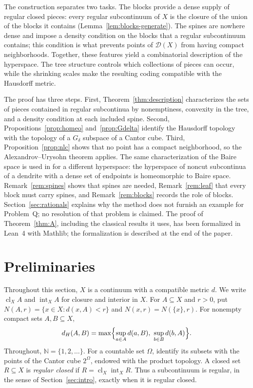 \documentclass[11pt]{amsart}
\theoremstyle{definition}
\theoremstyle{remark}
\newcommand{\clX}{\operatorname{cl}_X}
\newcommand{\intX}{\operatorname{int}_X}
\newcommand{\D}{\mathcal{D}}
\newcommand{\N}{\mathbb{N}}
\newcommand{\dH}{d_H}
\begin{document}
The construction separates two tasks. The blocks provide a dense supply of regular closed pieces: every regular subcontinuum of $X$ is the closure of the union of the blocks it contains (Lemma~\ref{lem:blocks-generate}). The spines are nowhere dense and impose a density condition on the blocks that a regular subcontinuum contains; this condition is what prevents points of $\D(X)$ from having compact neighborhoods. Together, these features yield a combinatorial description of the hyperspace. The tree structure controls which collections of pieces can occur, while the shrinking scales make the resulting coding compatible with the Hausdorff metric.

The proof has three steps. First, Theorem~\ref{thm:description} characterizes the sets of pieces contained in regular subcontinua by nonemptiness, convexity in the tree, and a density condition at each included spine. Second, Propositions~\ref{prop:homeo} and~\ref{prop:Gdelta} identify the Hausdorff topology with the topology of a $G_\delta$ subspace of a Cantor cube. Third, Proposition~\ref{prop:nlc} shows that no point has a compact neighborhood, so the Alexandrov--Urysohn theorem applies. The same characterization of the Baire space is used in \cite[Theorem~5.7]{HMMV} for a different hyperspace: the hyperspace of noncut subcontinua of a dendrite with a dense set of endpoints is homeomorphic to Baire space. Remark~\ref{rem:spines} shows that spines are needed, Remark~\ref{rem:leaf} that every block must carry spines, and Remark~\ref{rem:blocks} records the role of blocks. Section~\ref{sec:rationals} explains why the method does not furnish an example for Problem~Q; no resolution of that problem is claimed. The proof of Theorem~\ref{thm:A}, including the classical results it uses, has been formalized in Lean~4 with Mathlib; the formalization is described at the end of the paper.

\section{Preliminaries}\label{sec:prelim}

Throughout this section, $X$ is a continuum with a compatible metric $d$. We write $\clX A$ and $\intX A$ for closure and interior in $X$. For $A\subseteq X$ and $r>0$, put $N(A,r)=\{x\in X: d(x,A)<r\}$ and $N(x,r)=N(\{x\},r)$. For nonempty compact sets $A,B\subseteq X$,
\[
\dH(A,B)=\max\Bigl\{\sup_{a\in A}d(a,B),\ \sup_{b\in B}d(b,A)\Bigr\}.
\]
Throughout, $\N=\{1,2,\dots\}$. For a countable set $\Omega$, identify its subsets with the points of the Cantor cube $2^\Omega$, endowed with the product topology. A closed set $R\subseteq X$ is \emph{regular closed} if $R=\clX\intX R$. Thus a subcontinuum is regular, in the sense of Section~\ref{sec:intro}, exactly when it is regular closed.
\end{document}
